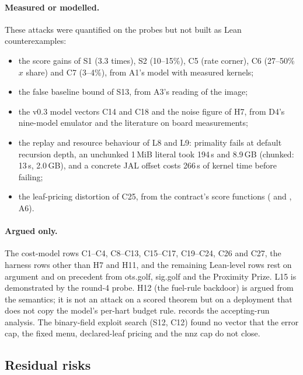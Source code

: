 \paragraph{Measured or modelled.} These attacks were quantified on the probes but not built as Lean
counterexamples:
\begin{itemize}[nosep]
\item the score gains of S1 (3.3 times), S2 (10--15\%), C5 (rate corner), C6 (27--50\% $x$ share) and
  C7 (3--4\%), from A1's model with measured kernels;
\item the false baseline bound of S13, from A3's reading of the image;
\item the v0.3 model vectors C14 and C18 and the noise figure of H7, from D4's nine-model emulator and
  the literature on board measurements;
\item the replay and resource behaviour of L8 and L9:  primality fails at default
  recursion depth, an unchunked 1\,MiB literal took 194\,s and 8.9\,GB (chunked: 13\,s, 2.0\,GB), and a
  concrete JAL offset costs 266\,s of kernel time before failing;
\item the leaf-pricing distortion of C25, from the contract's score functions ( and
  , A6).
\end{itemize}

\paragraph{Argued only.} The cost-model rows C1--C4, C8--C13, C15--C17, C19--C24, C26 and C27, the
harness rows other than H7 and H11, and the remaining Lean-level rows rest on argument and on
precedent from ots.golf, sig.golf and the Proximity Prize. L15 is demonstrated by the round-4  probe. H12 (the fuel-rule backdoor) is
argued from the semantics; it is not an attack on a scored theorem but on a deployment that does not copy the
model's per-hart budget rule.
 records the accepting-run analysis. The binary-field exploit search (S12,
C12) found no vector that the error cap, the fixed menu, declared-leaf pricing and the nnz cap do not
close.

\subsection{Residual risks}\label{subsec:thr-residual}

